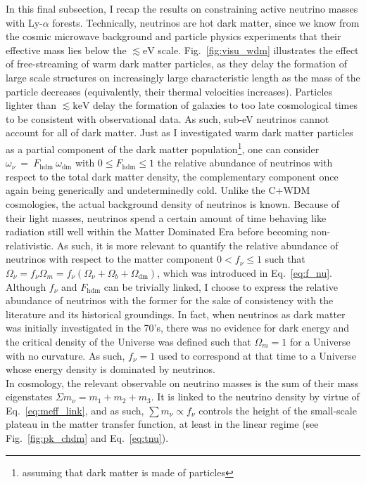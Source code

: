 In this final subsection, I recap the results on constraining active neutrino masses with Ly-$\alpha$ forests. Technically, neutrinos are hot dark matter, since we know from the cosmic microwave background and particle physics experiments that their effective mass lies below the $\lesssim \mathrm{eV}$ scale. Fig.~\ref{fig:visu_wdm} illustrates the effect of free-streaming of warm dark matter particles, as they delay the formation of large scale structures on increasingly large characteristic length as the mass of the particle decreases (equivalently, their thermal velocities increases). Particles lighter than $\lesssim \mathrm{keV}$ delay the formation of galaxies to too late cosmological times to be consistent with observational data. As such, sub-eV neutrinos cannot account for all of dark matter. Just as I investigated warm dark matter particles as a partial component of the dark matter population\footnote{assuming that dark matter is made of particles}, one can consider $\omega_\nu ~=~ F_{\mathrm{hdm}} ~\omega_{\mathrm{dm}}$ with $0 \leqslant F_{\mathrm{hdm}} \leqslant 1$ the relative abundance of neutrinos with respect to the total dark matter density, the complementary component once again being generically and undeterminedly cold. Unlike the C+WDM cosmologies, the actual background density of neutrinos is known. Because of their light masses, neutrinos spend a certain amount of time behaving like radiation still well within the Matter Dominated Era before becoming non-relativistic. As such, it is more relevant to quantify the relative abundance of neutrinos with respect to the matter component $0 < f_\nu \leqslant 1$ such that $\Omega_\nu = f_\nu \Omega_m = f_\nu ( \Omega_\nu + \Omega_b + \Omega_{\mathrm{dm}} )$, which was introduced in Eq.~\ref{eq:f_nu}. Although $f_\nu$ and $F_{\mathrm{hdm}}$ can be trivially linked, I choose to express the relative abundance of neutrinos with the former for the sake of consistency with the literature and its historical groundings. In fact, when neutrinos as dark matter was initially investigated in the 70's, there was no evidence for dark energy and the critical density of the Universe was defined such that $\Omega_m = 1$ for a Universe with no curvature. As such, $f_\nu = 1$ used to  correspond at that time to a Universe whose energy density is dominated by neutrinos. \\

In cosmology, the relevant observable on neutrino masses is the sum of their mass eigenstates $\Sigma m_\nu = m_1 + m_2 + m_3$. It is linked to the neutrino density by virtue of Eq.~\ref{eq:meff_link}, and as such, $\sum m_\nu \propto f_\nu$ controls the height of the small-scale plateau in the matter transfer function, at least in the linear regime (see Fig.~\ref{fig:pk_chdm} and Eq.~\ref{eq:tnu}). \\



